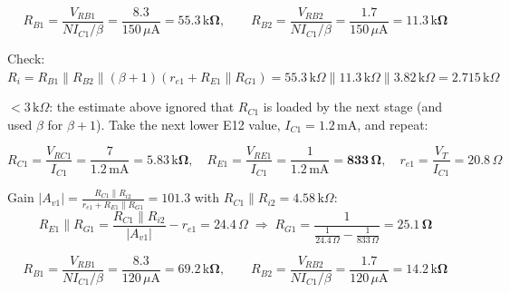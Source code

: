 \documentclass[11pt]{article}
\begin{document}
\[R_{B1} = \frac{V_{RB1}}{N I_{C1}/\beta} = \frac{8.3}{150\,\mu \mathrm{A}} = \mathbf{55.3\,\mathrm{k}\Omega},\qquad R_{B2} = \frac{V_{RB2}}{N I_{C1}/\beta} = \frac{1.7}{150\,\mu \mathrm{A}} = \mathbf{11.3\,\mathrm{k}\Omega}\]

Check: $R_i = R_{B1}\|R_{B2}\|(\beta+1)(r_{e1} + R_{E1}\|R_{G1}) = 55.3\,\mathrm{k}\Omega\|11.3\,\mathrm{k}\Omega\|3.82\,\mathrm{k}\Omega = 2.715\,\mathrm{k}\Omega$ 

$< 3\,\mathrm{k}\Omega$: the estimate above ignored that $R_{C1}$ is loaded by the next stage (and used $\beta$ for $\beta+1$). Take the next lower E12 value, $I_{C1} = 1.2\,\mathrm{m}\mathrm{A}$, and repeat:

\[R_{C1} = \frac{V_{RC1}}{I_{C1}} = \frac{7}{1.2\,\mathrm{m}\mathrm{A}} = \mathbf{5.83\,\mathrm{k}\Omega},\quad R_{E1} = \frac{V_{RE1}}{I_{C1}} = \frac{1}{1.2\,\mathrm{m}\mathrm{A}} = \mathbf{833\,\Omega},\quad r_{e1} = \frac{V_T}{I_{C1}} = 20.8\,\Omega\]

Gain $|A_{v1}| = \frac{R_{C1}\|R_{i2}}{r_{e1} + R_{E1}\|R_{G1}} = 101.3$ with $R_{C1}\|R_{i2} = 4.58\,\mathrm{k}\Omega$:\[R_{E1}\|R_{G1} = \frac{R_{C1}\|R_{i2}}{|A_{v1}|} - r_{e1} = 24.4\,\Omega \;\Rightarrow\; R_{G1} = \frac{1}{\frac{1}{24.4\,\Omega} - \frac{1}{833\,\Omega}} = \mathbf{25.1\,\Omega}\]

\[R_{B1} = \frac{V_{RB1}}{N I_{C1}/\beta} = \frac{8.3}{120\,\mu \mathrm{A}} = \mathbf{69.2\,\mathrm{k}\Omega},\qquad R_{B2} = \frac{V_{RB2}}{N I_{C1}/\beta} = \frac{1.7}{120\,\mu \mathrm{A}} = \mathbf{14.2\,\mathrm{k}\Omega}\]
\end{document}
